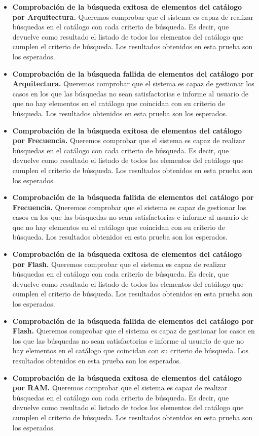 \begin{itemize}
\begin{itemize}
	\item \textbf{Comprobación de la búsqueda exitosa de elementos del catálogo por Arquitectura.} Queremos comprobar que el sistema es capaz de realizar búsquedas en el catálogo con cada criterio de búsqueda. Es decir, que devuelve como resultado el listado de todos los elementos del catálogo que cumplen el criterio de búsqueda. Los resultados obtenidos en esta prueba son los esperados.
	\item \textbf{Comprobación de la búsqueda fallida de elementos del catálogo por Arquitectura.} Queremos comprobar que el sistema es capaz de gestionar los casos en los que las búsquedas no sean satisfactorias e informe al usuario de que no hay elementos en el catálogo que coincidan con su criterio de búsqueda. Los resultados obtenidos en esta prueba son los esperados.
	\item \textbf{Comprobación de la búsqueda exitosa de elementos del catálogo por Frecuencia.} Queremos comprobar que el sistema es capaz de realizar búsquedas en el catálogo con cada criterio de búsqueda. Es decir, que devuelve como resultado el listado de todos los elementos del catálogo que cumplen el criterio de búsqueda. Los resultados obtenidos en esta prueba son los esperados.
	\item \textbf{Comprobación de la búsqueda fallida de elementos del catálogo por Frecuencia.} Queremos comprobar que el sistema es capaz de gestionar los casos en los que las búsquedas no sean satisfactorias e informe al usuario de que no hay elementos en el catálogo que coincidan con su criterio de búsqueda. Los resultados obtenidos en esta prueba son los esperados.
	\item \textbf{Comprobación de la búsqueda exitosa de elementos del catálogo por Flash.} Queremos comprobar que el sistema es capaz de realizar búsquedas en el catálogo con cada criterio de búsqueda. Es decir, que devuelve como resultado el listado de todos los elementos del catálogo que cumplen el criterio de búsqueda. Los resultados obtenidos en esta prueba son los esperados.
	\item \textbf{Comprobación de la búsqueda fallida de elementos del catálogo por Flash.} Queremos comprobar que el sistema es capaz de gestionar los casos en los que las búsquedas no sean satisfactorias e informe al usuario de que no hay elementos en el catálogo que coincidan con su criterio de búsqueda. Los resultados obtenidos en esta prueba son los esperados.
	\item \textbf{Comprobación de la búsqueda exitosa de elementos del catálogo por RAM.} Queremos comprobar que el sistema es capaz de realizar búsquedas en el catálogo con cada criterio de búsqueda. Es decir, que devuelve como resultado el listado de todos los elementos del catálogo que cumplen el criterio de búsqueda. Los resultados obtenidos en esta prueba son los esperados.

\end{itemize}
\end{itemize}
